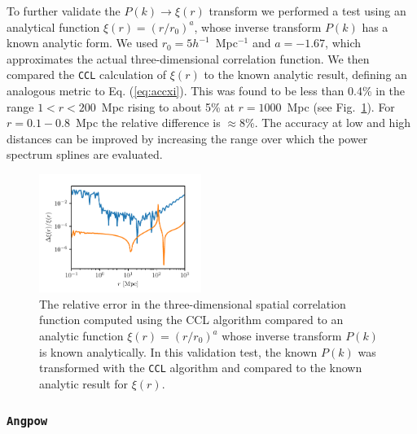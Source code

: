 \documentclass[\docopts]{\docclass}
\newcommand{\ccl}{{\tt CCL}\xspace}
\begin{document}
To further validate the $P(k) \to \xi(r)$ transform we performed a test using an analytical function $\xi(r) = (r / r_0)^a$, whose inverse transform $P(k)$ has a known analytic form. We used $r_0 = 5 h^{-1}$~Mpc$^{-1}$ and $a = -1.67$, which approximates the actual three-dimensional correlation function.  We then compared the \ccl calculation of $\xi(r)$ to the known analytic result, defining an analogous metric to Eq. (\ref{eq:accxi}). This was found to be less than 0.4\% in the range $1 < r < 200$~Mpc rising to about 5\% at $r = 1000$~Mpc (see Fig.~\ref{fig:analytic_xi}). For $r=0.1-0.8$~Mpc the relative difference is $\approx$8\%. The accuracy at low and high distances can be improved by increasing the range over which the power spectrum splines are evaluated.
%
\begin{figure}[htbp]
\centering
\includegraphics[width=0.47\textwidth]{3dcorr_analytic}
\caption{The relative error in the three-dimensional spatial correlation function computed using the CCL algorithm compared to an analytic function $\xi(r) = (r/r_0)^a$ whose inverse transform $P(k)$ is known analytically. In this validation test, the known $P(k)$ was transformed with the \ccl algorithm and compared to the known analytic result for $\xi(r)$.}
\label{fig:analytic_xi}
\end{figure}

\subsubsection{\tt Angpow}
\end{document}
